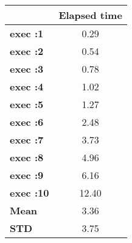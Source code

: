 \begin{tiny}\begin{tabular}{|l|c|}
\hline
&\textbf{Elapsed time}\\\hline
\textbf{exec :1}&0.29\\\hline
\textbf{exec :2}&0.54\\\hline
\textbf{exec :3}&0.78\\\hline
\textbf{exec :4}&1.02\\\hline
\textbf{exec :5}&1.27\\\hline
\textbf{exec :6}&2.48\\\hline
\textbf{exec :7}&3.73\\\hline
\textbf{exec :8}&4.96\\\hline
\textbf{exec :9}&6.16\\\hline
\textbf{exec :10}&12.40\\\hline
\textbf{ Mean}&3.36\\\hline
\textbf{ STD}&3.75\\\hline
\end{tabular}
\end{tiny}
